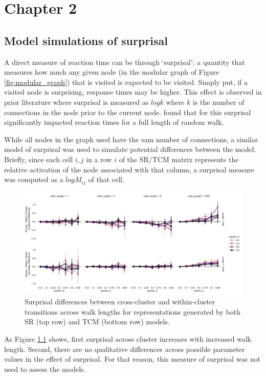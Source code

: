 \chapter{Chapter 2}

\section{Model simulations of surprisal}
A direct measure of reaction time can be through `surprisal'; a quantity that measures how much any given node (in the modular graph of Figure \ref{fig:modular_graph}) that is visited is expected to be visited. Simply put, if a visited node is surprising, response times may be higher. This effect is observed in prior literature where surprisal is measured as $log k$ where $k$ is the number of connections in the node prior to the current node. \cite{lynn2020human} found that for this surprisal significantly impacted reaction times for a full length of random walk.

While all nodes in the graph used have the sam number of connections, a similar model of surprisal was used to simulate potential differences between the model. Briefly, since each cell $i, j$ in a row $i$ of the SR/TCM matrix represents the relative activation of the node associated with that column, a surprisal measure was computed as a $log M_{ij}$ of that cell.

\begin{figure}
    \centering
    \includegraphics[width = \textwidth]{chapter_notebooks/chapter_2/figures/SR_TCM_walklength_boundary_nonboundary_surprisaldiff.png}
    \caption{Surprisal differences between cross-cluster and within-cluster transitions across walk lengths for representations generated by both SR (top row) and TCM (bottom row) models.}
    \label{fig:surprisal-sims}
\end{figure}

As Figure \ref{fig:surprisal-sims} shows, first surprisal across cluster increases with increased walk length. Second, there are no qualitative differences across possible parameter values in the effect of surprisal. For that reason, this measure of surprisal was not used to assess the models.


